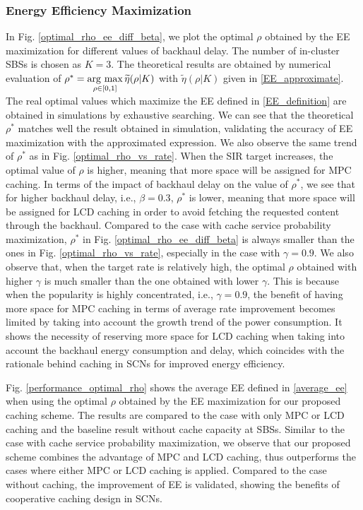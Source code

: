 \documentclass[twocolumns,10pt]{IEEEtran}
\newcommand{\argmax}{\mathop{\rm arg~max}\limits}
\begin{document}
\subsubsection{Energy Efficiency Maximization}
In Fig. \ref{optimal_rho_ee_diff_beta}, we plot the optimal $\rho$ obtained by the EE maximization for different values of backhaul delay. The number of in-cluster SBSs is chosen as $K=3$. The theoretical results are obtained by numerical evaluation of $\rho^{*}=\argmax_{\rho \in[0,1] } \widetilde{\eta}(\rho| K)$ with $\widetilde{\eta}(\rho| K)$ given in \eqref{EE_approximate}. The real optimal values which maximize the EE defined in \eqref{EE_definition} are obtained in simulations by exhaustive searching. We can see that the theoretical $\rho^{*}$ matches well the result obtained in simulation, validating the accuracy of EE maximization with the approximated expression. We also observe the same trend of $\rho^{*}$ as in Fig. \ref{optimal_rho_vs_rate}. When the SIR target increases, the optimal value of $\rho$ is higher, meaning that more space will be assigned for MPC caching. In terms of the impact of backhaul delay on the value of $\rho^{*}$, we see that for higher backhaul delay, i.e., $\beta=0.3$, $\rho^{*}$ is lower, meaning that more space will be assigned for LCD caching in order to avoid fetching the requested content through the backhaul. Compared to the case with cache service probability maximization, $\rho^{*}$ in Fig. \ref{optimal_rho_ee_diff_beta} is always smaller than the ones in Fig. \ref{optimal_rho_vs_rate}, especially in the case with $\gamma=0.9$. We also observe that, when the target rate is relatively high, the optimal $\rho$ obtained with higher $\gamma$ is much smaller than the one obtained with lower $\gamma$. This is because when the popularity is highly concentrated, i.e., $\gamma=0.9$, the benefit of having more space for MPC caching in terms of average rate improvement becomes limited by taking into account the growth trend of the power consumption. It shows the necessity of reserving more space for LCD caching when taking into account the backhaul energy consumption and delay, which coincides with the rationale behind caching in SCNs for improved energy efficiency.



Fig. \ref{performance_optimal_rho} shows the average EE defined in \eqref{average_ee} when using the optimal $\rho$ obtained by the EE maximization for our proposed caching scheme. The results are compared to the case with only MPC or LCD caching and the baseline result without cache capacity at SBSs. Similar to the case with cache service probability maximization, we observe that our proposed scheme combines the advantage of MPC and LCD caching, thus outperforms the cases where either MPC or LCD caching is applied. Compared to the case without caching, the improvement of EE is validated, showing the benefits of cooperative caching design in SCNs. 
\end{document}
